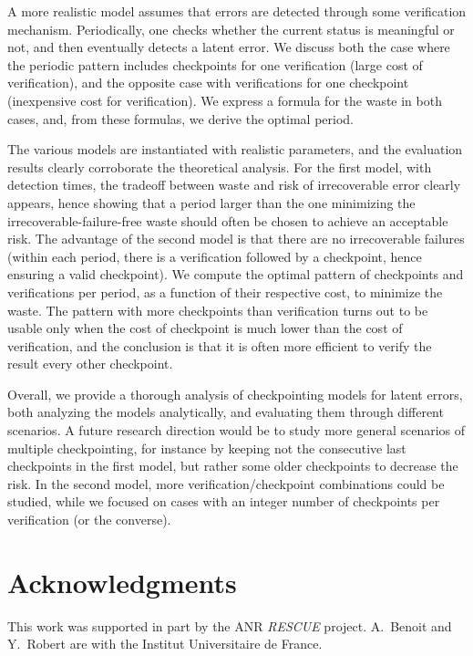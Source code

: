 \documentclass[10pt,table]{article}
\begin{document}
A more realistic model assumes that errors are detected through some verification mechanism.
Periodically, one checks whether the current status is meaningful or not, and then eventually detects
a latent error. We discuss both the case where the periodic pattern includes  checkpoints 
for one verification (large cost of verification), and the opposite case with  verifications
for one checkpoint (inexpensive cost for verification). We express a formula for the waste in both cases,
and, from these formulas, we derive the optimal period. 

The various models are instantiated with realistic parameters, and the evaluation results 
clearly corroborate the theoretical analysis. For the first model, with detection times, 
the tradeoff between waste and risk of irrecoverable error clearly appears, hence showing that
a period larger than the one minimizing the irrecoverable-failure-free waste should often be chosen 
to achieve an acceptable risk. 
The advantage of the second model is that there are no irrecoverable failures (within each period,
there is a verification followed by a checkpoint, hence ensuring a valid checkpoint). 
We compute the optimal pattern of checkpoints and verifications per period, as a function of their
respective cost, to minimize the waste. The pattern with more checkpoints than verification turns out
to be usable only when the cost of checkpoint is much lower than the cost of verification, 
and the conclusion is that it is often more efficient to verify the result every other checkpoint. 

Overall, we provide a thorough analysis of checkpointing models for latent errors,
both analyzing the models analytically, and evaluating them through different scenarios. 
A future research direction would be to study more general scenarios of multiple checkpointing,
for instance by keeping not the consecutive  last checkpoints in the first model, but rather 
some older checkpoints to decrease the risk. In the second model, more 
verification/checkpoint combinations could be studied, while we focused on cases 
with an integer number of checkpoints per verification (or the converse). 



\section*{Acknowledgments}
This work was supported in part by the ANR {\em RESCUE} project. 
A.~Benoit and Y.~Robert are with the Institut Universitaire de France.




\end{document}
